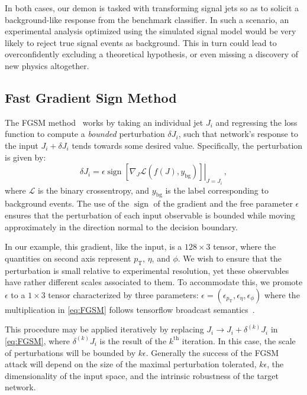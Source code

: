 \documentclass[reprint,nofootinbib,...]{revtex4-1}
\DeclareMathOperator{\sign}{sign}
\newcommand{\nconst}{128}       %
\newcommand{\pt}{p_\mathrm{T}} %
\begin{document}
In both cases, our demon is tasked with transforming signal jets so as to solicit a background-like response from the benchmark classifier.
In such a scenario, an experimental analysis optimized using the simulated signal model would be very likely to reject true signal events as background.
This in turn could lead to overconfidently excluding a theoretical hypothesis, or even missing a discovery of new physics altogether.

\subsection{Fast Gradient Sign Method}
The FGSM method~\cite{DBLP:journals/corr/GoodfellowSS14} works by taking an individual jet $J_i$ and regressing the loss function to compute a \textit{bounded} perturbation $\delta J_i$, such that network's response to the input $J_i + \delta J_i$ tends towards some desired value.
Specifically, the perturbation is given by:
\begin{equation}
\label{eq:FGSM}
\delta J_i = \epsilon\left.\sign\left[\nabla_{J} \mathcal{L}\left(f(J), y_\mathrm{bg}\right)\right]\right\rvert_{J=J_i} \,,
\end{equation}
where $\mathcal{L}$ is the binary crossentropy, and $y_\mathrm{bg}$ is the label corresponding to background events.
The use of the $\sign$ of the gradient and the free parameter $\epsilon$ ensures that the perturbation of each input observable is bounded while moving approximately in the direction normal to the decision boundary.

In our example, this gradient, like the input, is a $\nconst\times3$ tensor, where the quantities on second axis represent $\pt$, $\eta$, and $\phi$.
We wish to ensure that the perturbation is small relative to experimental resolution, yet these observables have rather different scales associated to them.
To accommodate this, we promote $\epsilon$ to a $1\times3$ tensor characterized by three parameters: $\epsilon = (\epsilon_{\pt}, \epsilon_\eta, \epsilon_\phi)$ where the multiplication in \ref{eq:FGSM} follows tensorflow broadcast semantics~\cite{tensorflow}.

This procedure may be applied iteratively by replacing $J_i \rightarrow J_i + \delta^{(k)} J_i$ in \ref{eq:FGSM}, where $\delta^{(k)}J_i$ is the result of the $k^\mathrm{th}$ iteration.
In this case, the scale of perturbations will be bounded by $k\epsilon$.
Generally the success of the FGSM attack will depend on the size of the maximal perturbation tolerated, $k\epsilon$, the dimensionality of the input space, and the intrinsic robustness of the target network.
\end{document}
